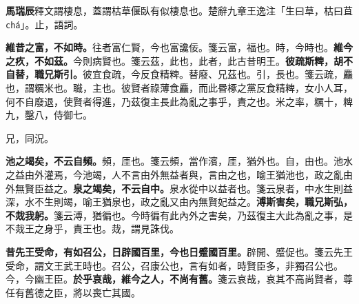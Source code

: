 \begin{quoting}\textbf{馬瑞辰}釋文謂棲息，蓋謂枯草偃臥有似棲息也。楚辭九章王逸注「生曰草，枯曰苴 \texttt{chá}」。止，語詞。\end{quoting}

\textbf{維昔之富，不如時。}{\footnotesize 往者富仁賢，今也富讒佞。箋云富，福也。時，今時也。}\textbf{維今之疚，不如茲。}{\footnotesize 今則病賢也。箋云茲，此也，此者，此古昔明王。}\textbf{彼疏斯粺，胡不自替，職兄斯引。}{\footnotesize 彼宜食疏，今反食精粺。替廢、兄茲也。引，長也。箋云疏，麤也，謂糲米也。職，主也。彼賢者祿薄食麤，而此昬椓之黨反食精粺，女小人耳，何不自廢退，使賢者得進，乃茲復主長此為亂之事乎，責之也。米之率，糲十，粺九，鑿八，侍御七。}

\begin{quoting}兄，同況。\end{quoting}

\textbf{池之竭矣，不云自頻。}{\footnotesize 頻，厓也。箋云頻，當作濱，厓，猶外也。自，由也。池水之益由外灌焉，今池竭，人不言由外無益者與，言由之也，喻王猶池也，政之亂由外無賢臣益之。}\textbf{泉之竭矣，不云自中。}{\footnotesize 泉水從中以益者也。箋云泉者，中水生則益深，水不生則竭，喻王猶泉也，政之亂又由內無賢妃益之。}\textbf{溥斯害矣，職兄斯弘，不烖我躬。}{\footnotesize 箋云溥，猶徧也。今時徧有此內外之害矣，乃茲復主大此為亂之事，是不烖王之身乎，責王也。烖，謂見誅伐。}

\textbf{昔先王受命，有如召公，日辟國百里，今也日蹙國百里。}{\footnotesize 辟開、蹙促也。箋云先王受命，謂文王武王時也。召公，召康公也，言有如者，時賢臣多，非獨召公也。今，今幽王臣。}\textbf{於乎哀哉，維今之人，不尚有舊。}{\footnotesize 箋云哀哉，哀其不高尚賢者，尊任有舊德之臣，將以喪亡其國。}

